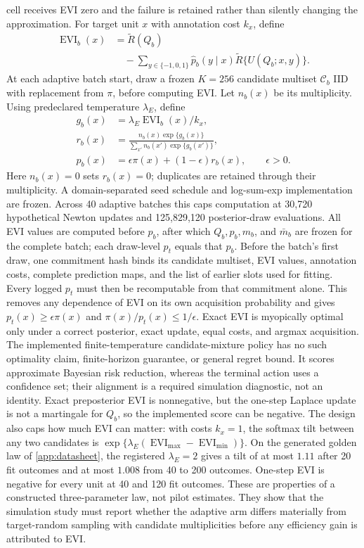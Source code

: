 \documentclass{article}
\begin{document}
cell receives EVI zero and the failure is retained rather than silently
changing the approximation. For target unit $x$ with annotation cost
$k_x$, define
\begin{align}
\operatorname{EVI}_{b}(x)
&=\widetilde R(Q_b)\nonumber\\
&\quad-
\sum_{y\in\{-1,0,1\}}\widehat p_b(y\mid x)
\widetilde R\{U(Q_b;x,y)\}.
\end{align}
At each adaptive batch start, draw a frozen $K=256$ candidate multiset
$\mathcal C_b$ IID with replacement from $\pi$, before computing EVI. Let
$n_b(x)$ be its multiplicity. Using predeclared temperature $\lambda_E$, define
\begin{align}
g_b(x)&=\lambda_E\operatorname{EVI}_{b}(x)/k_x,\\
r_b(x)&=\frac{n_b(x)\exp\{g_b(x)\}}
{\sum_{x'}n_b(x')\exp\{g_b(x')\}},\\
p_b(x)&=\epsilon\pi(x)+(1-\epsilon)r_b(x),
\qquad \epsilon>0.
\label{eq:explore}
\end{align}
Here $n_b(x)=0$ sets $r_b(x)=0$; duplicates are retained through their
multiplicity. A domain-separated seed schedule and log-sum-exp implementation
are frozen. Across 40 adaptive batches this caps computation at 30,720
hypothetical Newton updates and 125,829,120 posterior-draw evaluations.
All EVI values are computed before $p_b$, after which $Q_b,p_b,m_b$, and
$\bar m_b$ are frozen for the complete batch; each draw-level $p_t$ equals
that $p_b$. Before the batch's first draw, one commitment hash binds its
candidate multiset, EVI values, annotation costs, complete prediction maps,
and the list of earlier slots used for fitting. Every logged $p_t$ must then
be recomputable from that commitment alone. This removes any dependence of EVI on its own acquisition
probability and gives $p_t(x)\ge\epsilon\pi(x)$ and
$\pi(x)/p_t(x)\le1/\epsilon$. Exact EVI is myopically optimal only under a
correct posterior, exact update, equal costs, and argmax acquisition. The
implemented finite-temperature candidate-mixture policy has no such
optimality claim, finite-horizon guarantee, or general regret bound. It scores approximate Bayesian risk
reduction, whereas the terminal action uses a confidence set; their alignment
is a required simulation diagnostic, not an identity.
Exact preposterior EVI is nonnegative, but the one-step Laplace update is not
a martingale for $Q_b$, so the implemented score can be negative. The design
also caps how much EVI can matter: with costs $k_x=1$, the softmax tilt between
any two candidates is $\exp\{\lambda_E(\operatorname{EVI}_{\max}
-\operatorname{EVI}_{\min})\}$. On the generated golden law of
\cref{app:datasheet}, the registered $\lambda_E=2$ gives a tilt of at most
$1.11$ after 20 fit outcomes and at most $1.008$ from 40 to 200 outcomes.
One-step EVI is negative for every unit at 40 and 120 fit outcomes. These are
properties of a constructed three-parameter law, not pilot estimates. They
show that the simulation study must report whether the adaptive arm differs
materially from target-random sampling with candidate multiplicities before
any efficiency gain is attributed to EVI.
\end{document}
